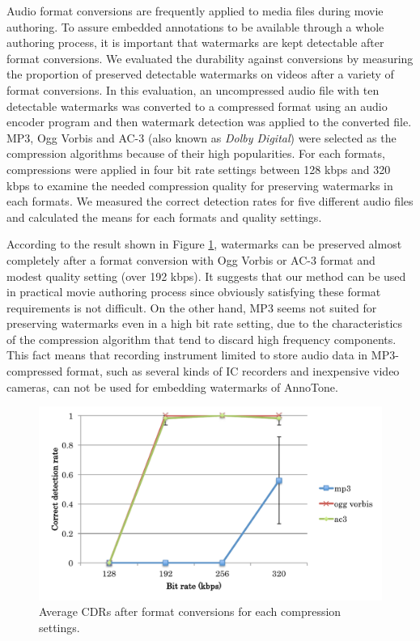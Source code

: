 Audio format conversions are frequently applied to media files during movie authoring.
To assure embedded annotations to be available through a whole authoring process, it is important that watermarks are kept detectable after format conversions.
We evaluated the durability against conversions by measuring the proportion of preserved detectable watermarks on videos after a variety of format conversions.
In this evaluation, an uncompressed audio file with ten detectable watermarks was converted to a compressed format using an audio encoder program and then watermark detection was applied to the converted file.
MP3, Ogg Vorbis and AC-3 (also known as {\it Dolby Digital}) were selected as the compression algorithms because of their high popularities.
For each formats, compressions were applied in four bit rate settings between 128 kbps and 320 kbps to examine the needed compression quality for preserving watermarks in each formats.
We measured the correct detection rates for five different audio files and calculated the means for each formats and quality settings.

According to the result shown in Figure \ref{fig:eval_conv}, watermarks can be preserved almost completely after a format conversion with Ogg Vorbis or AC-3 format and modest quality setting (over 192 kbps).
It suggests that our method can be used in practical movie authoring process since obviously satisfying these format requirements is not difficult.
On the other hand, MP3 seems not suited for preserving watermarks even in a high bit rate setting, due to the characteristics of the compression algorithm that tend to discard high frequency components.
This fact means that recording instrument limited to store audio data in MP3-compressed format, such as several kinds of IC recorders and inexpensive video cameras, can not be used for embedding watermarks of AnnoTone.

\begin{figure}[htbp]
 \begin{center}
  \includegraphics[width=120mm]{evaluation_conversion.pdf}
 \end{center}
 \caption{Average CDRs after format conversions for each compression settings.}
 \label{fig:eval_conv}
\end{figure}
